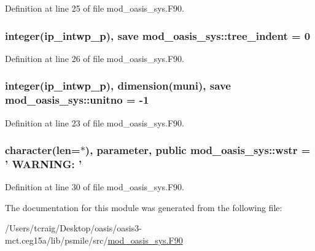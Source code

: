 Definition at line 25 of file mod\+\_\+oasis\+\_\+sys.\+F90.

\hypertarget{classmod__oasis__sys_a159b60d106efcb1f42722b08c5511ad0}{
\subsubsection[{tree\+\_\+indent}]{\setlength{\rightskip}{0pt plus 5cm}integer(ip\+\_\+intwp\+\_\+p), save mod\+\_\+oasis\+\_\+sys\+::tree\+\_\+indent = 0\hspace{0.3cm}{\ttfamily [private]}}}\label{classmod__oasis__sys_a159b60d106efcb1f42722b08c5511ad0}


Definition at line 26 of file mod\+\_\+oasis\+\_\+sys.\+F90.

\hypertarget{classmod__oasis__sys_a0fc21eee7f67c5be26a90e23d8c346db}{
\subsubsection[{unitno}]{\setlength{\rightskip}{0pt plus 5cm}integer(ip\+\_\+intwp\+\_\+p), dimension({\bf muni}), save mod\+\_\+oasis\+\_\+sys\+::unitno = -\/1\hspace{0.3cm}{\ttfamily [private]}}}\label{classmod__oasis__sys_a0fc21eee7f67c5be26a90e23d8c346db}


Definition at line 23 of file mod\+\_\+oasis\+\_\+sys.\+F90.

\hypertarget{classmod__oasis__sys_a4e16ba69c68a3a39c8b8aa3b92234ce1}{
\subsubsection[{wstr}]{\setlength{\rightskip}{0pt plus 5cm}character(len=$\ast$), parameter, public mod\+\_\+oasis\+\_\+sys\+::wstr = ' W\+A\+R\+N\+I\+N\+G\+: '}}\label{classmod__oasis__sys_a4e16ba69c68a3a39c8b8aa3b92234ce1}


Definition at line 30 of file mod\+\_\+oasis\+\_\+sys.\+F90.



The documentation for this module was generated from the following file\+:\begin{DoxyCompactItemize}
\item 
/\+Users/tcraig/\+Desktop/oasis/oasis3-\/mct.\+ceg15a/lib/psmile/src/\hyperlink{mod__oasis__sys_8_f90}{mod\+\_\+oasis\+\_\+sys.\+F90}\end{DoxyCompactItemize}
